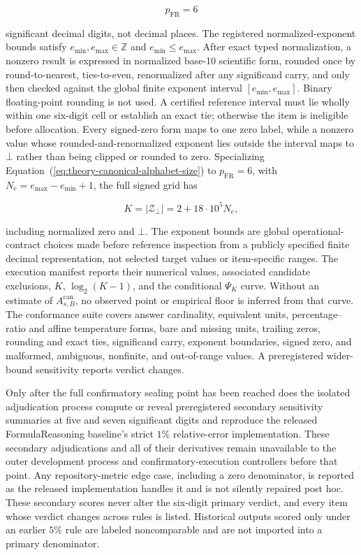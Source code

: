 \documentclass[10pt]{article} %
\renewcommand{\eqref}[1]{\textup{(\ref{#1})}}
\providecommand{\1}{\mathbf{1}}  %
\theoremstyle{remark}
\theoremstyle{definition}
\begin{document}
\begin{equation}
p_{\mathrm{FR}}=6
\end{equation}

significant decimal digits, not decimal places. The registered normalized-exponent bounds satisfy $e_{\min},e_{\max}\in\mathbb Z$ and $e_{\min}\leq e_{\max}$. After exact typed normalization, a nonzero result is expressed in normalized base-10 scientific form, rounded once by round-to-nearest, ties-to-even, renormalized after any significand carry, and only then checked against the global finite exponent interval $[e_{\min},e_{\max}]$. Binary floating-point rounding is not used. A certified reference interval must lie wholly within one six-digit cell or establish an exact tie; otherwise the item is ineligible before allocation. Every signed-zero form maps to one zero label, while a nonzero value whose rounded-and-renormalized exponent lies outside the interval maps to $\bot$ rather than being clipped or rounded to zero. Specializing Equation~\eqref{eq:theory-canonical-alphabet-size} to $p_{\mathrm{FR}}=6$, with $N_e=e_{\max}-e_{\min}+1$, the full signed grid has

\begin{equation}
K=\lvert\mathcal Z_{\bot}\rvert=2+18\cdot10^5N_e,
\label{eq:pilot-canonical-alphabet-size}
\end{equation}

including normalized zero and $\bot$. The exponent bounds are global operational-contract choices made before
reference inspection from a publicly specified finite decimal representation,
not selected target values or item-specific ranges. The execution manifest
reports their numerical values, associated candidate exclusions, $K$, $\log_2(K-1)$, and the conditional
$\Psi_K$ curve. Without an estimate of $A_{s,B}^{\mathrm{can}}$, no observed
point or empirical floor is inferred from that curve. The conformance suite
covers answer cardinality, equivalent units, percentage--ratio and affine
temperature forms, bare and missing units, trailing zeros, rounding and exact
ties, significand carry, exponent boundaries, signed zero, and malformed,
ambiguous, nonfinite, and out-of-range values. A preregistered wider-bound
sensitivity reports verdict changes.

Only after the full confirmatory sealing point has been reached does the isolated adjudication process compute or reveal preregistered secondary sensitivity summaries at five and seven significant digits and reproduce the released FormulaReasoning baseline's strict $1\%$ relative-error implementation. These secondary adjudications and all of their derivatives remain unavailable to the outer development process and confirmatory-execution controllers before that point. Any repository-metric edge case, including a zero denominator, is reported as the released implementation handles it and is not silently repaired post hoc. These secondary scores never alter the six-digit primary verdict, and every item whose verdict changes across rules is listed. Historical outputs scored only under an earlier $5\%$ rule are labeled noncomparable and are not imported into a primary denominator.
\end{document}
